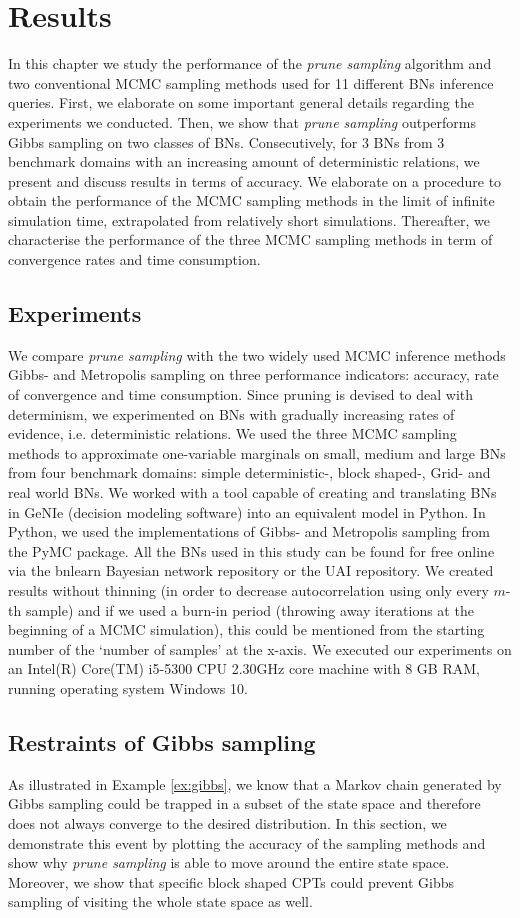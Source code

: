 \documentclass[a4paper, twoside, 11pt]{report}
\theoremstyle{plain}
\theoremstyle{definition}
\theoremstyle{remark}
\newcommand{\ps}{\textit{prune sampling }}
\begin{document}
\chapter{Results}
In this chapter we study the performance of the \ps algorithm and two conventional MCMC sampling methods used for 11 different BNs inference queries. First, we elaborate on some important general details regarding the experiments we conducted. Then, we show that \ps outperforms Gibbs sampling on two classes of BNs. Consecutively, for 3 BNs from 3 benchmark domains with an increasing amount of deterministic relations, we present and discuss results in terms of accuracy. We elaborate on a procedure to obtain the performance of the MCMC sampling methods in the limit of infinite simulation time, extrapolated from relatively short simulations. Thereafter, we characterise the performance of the three MCMC sampling methods in term of convergence rates and time consumption. 

\section{Experiments}
We compare \ps with the two widely used MCMC inference methods Gibbs- and Metropolis sampling on three performance indicators: accuracy, rate of convergence and time consumption. Since pruning is devised to deal with determinism, we experimented on BNs with gradually increasing rates of evidence, i.e. deterministic relations. We used the three MCMC sampling methods to approximate one-variable marginals on small, medium and large BNs from four benchmark domains: simple deterministic-, block shaped-, Grid- and real world BNs. We worked with a tool capable of creating and translating BNs in GeNIe (decision modeling software) into an equivalent model in Python. In Python, we used the implementations of Gibbs- and Metropolis sampling from the PyMC package. All the BNs used in this study can be found for free online via the bnlearn Bayesian network repository or the UAI repository. We created results without thinning (in order to decrease autocorrelation using only every $m$-th sample) and if we used a burn-in period (throwing away iterations at the beginning of a MCMC simulation), this could be mentioned from the starting number of the `number of samples' at the x-axis. We executed our experiments on an Intel(R) Core(TM) i5-5300 CPU 2.30GHz core machine with 8 GB RAM, running operating system Windows 10.

\section{Restraints of Gibbs sampling}\label{sec:gibbs-res}
As illustrated in Example \ref{ex:gibbs}, we know that a Markov chain generated by Gibbs sampling could be trapped in a subset of the state space and therefore does not always converge to the desired distribution. In this section, we demonstrate this event by plotting the accuracy of the sampling methods and show why \ps is able to move around the entire state space. Moreover, we show that specific block shaped CPTs could prevent Gibbs sampling of visiting the whole state space as well. \\
\end{document}
